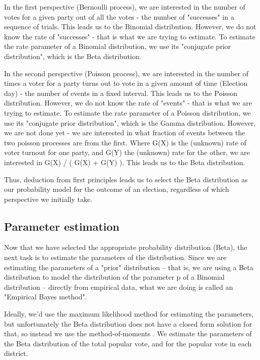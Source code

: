 \documentclass[preprint,12pt]{article}
\begin{document}
In the first perspective (Bernoulli process), we are interested in the number of votes for a given party out of all the votes - the number of "successes" in a sequence of trials.  This leads us to the Binomial distribution.  However, we do not know the rate of "successes" - that is what we are trying to estimate.  To estimate the rate parameter of a Binomial distribution, we use its "conjugate prior distribution", which is the Beta distribution.
 
In the second perspective (Poisson process), we are interested in the number of times a voter for a party turns out to vote in a given amount of time (Election day) - the number of events in a fixed interval. This leads us to the Poisson distribution.  However, we do not know the rate of "events" - that is what we are trying to estimate.  To estimate the rate parameter of a Poisson distribution, we use its "conjugate prior distribution", which is the Gamma distribution.  However, we are not done yet - we are interested in what fraction of events between the two poisson processes are from the first.  Where G(X) is the (unknown) rate of voter turnout for one party, and G(Y) the (unknown) rate for the other, we are interested in G(X) / ( G(X) + G(Y) ).  This leads us to the Beta distribution.
 
Thus, deduction from first principles leads us to select the Beta distribution as our probability model for the outcome of an election, regardless of which perspective we initially take.
 
\subsection{Parameter estimation}
 
Now that we have selected the appropriate probability distribution (Beta), the next task is to estimate the parameters of the distribution.  Since we are estimating the parameters of a "prior" distribution -- that is, we are using a Beta distribution to model the distribution of the parameter p of a Binomial distribution -- directly from empirical data, what we are doing is called an "Empirical Bayes method".
 
Ideally, we'd use the maximum likelihood method for estimating the parameters, but unfortunately the Beta distribution does not have a closed form solution for that, so instead we use the method-of-moments .  We estimate the parameters of the Beta distribution of the total popular vote, and for the popular vote in each district.  
 
\end{document}
